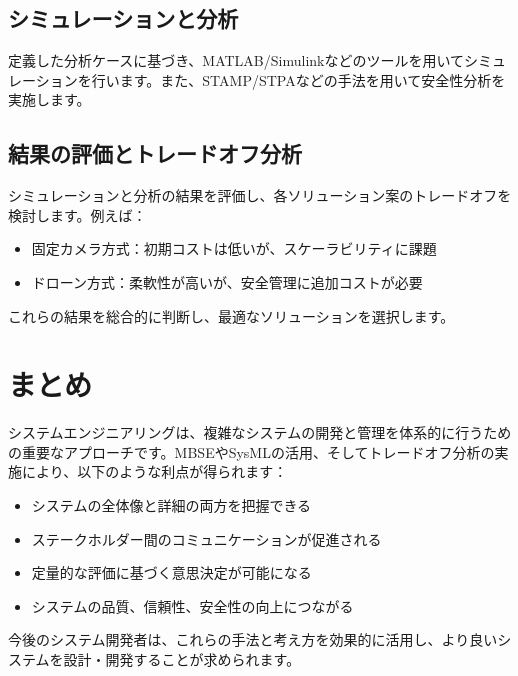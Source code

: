 \subsection{シミュレーションと分析}

定義した分析ケースに基づき、MATLAB/Simulinkなどのツールを用いてシミュレーションを行います。また、STAMP/STPAなどの手法を用いて安全性分析を実施します。

\subsection{結果の評価とトレードオフ分析}

シミュレーションと分析の結果を評価し、各ソリューション案のトレードオフを検討します。例えば：

\begin{itemize}
    \item 固定カメラ方式：初期コストは低いが、スケーラビリティに課題
    \item ドローン方式：柔軟性が高いが、安全管理に追加コストが必要
\end{itemize}

これらの結果を総合的に判断し、最適なソリューションを選択します。

\section{まとめ}

システムエンジニアリングは、複雑なシステムの開発と管理を体系的に行うための重要なアプローチです。MBSEやSysMLの活用、そしてトレードオフ分析の実施により、以下のような利点が得られます：

\begin{itemize}
    \item システムの全体像と詳細の両方を把握できる
    \item ステークホルダー間のコミュニケーションが促進される
    \item 定量的な評価に基づく意思決定が可能になる
    \item システムの品質、信頼性、安全性の向上につながる
\end{itemize}

今後のシステム開発者は、これらの手法と考え方を効果的に活用し、より良いシステムを設計・開発することが求められます。

